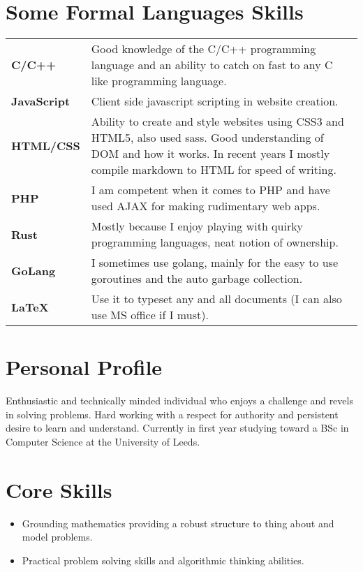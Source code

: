 \documentclass[9pt,a4paper]{article}
\begin{document}
\begin{multicols*}{2}
  \section*{Some Formal Languages Skills}
\begin{center}
  \begin{tabular}{p{2cm} p{6cm}}
  \textbf{C/C++}&Good knowledge of the C/C++ programming language and an ability to catch on fast to any C like programming language.\\[.1cm]
  \textbf{JavaScript}&Client side javascript scripting in website creation.\\[.1cm]
  \textbf{HTML/CSS}&Ability to create and style websites using CSS3 and HTML5, also used sass. Good understanding of DOM and how it works. In recent years I mostly compile markdown to HTML for speed of writing.\\[.1cm]
  \textbf{PHP}&I am competent when it comes to PHP and have used AJAX for making rudimentary web apps.\\[.1cm]
  \textbf{Rust}&Mostly because I enjoy playing with quirky programming languages, neat notion of ownership.\\[.1cm]
  \textbf{GoLang}&I sometimes use golang, mainly for the easy to use goroutines and the auto garbage collection.\\[.1cm]
  \textbf{\LaTeX}&Use it to typeset any and all documents (I can also use MS office if I must).\\
\end{tabular}
\end{center}

\section*{Personal Profile}
Enthusiastic and technically minded individual who enjoys a challenge and revels in solving problems.
Hard working with a respect for authority and persistent desire to learn and understand.
Currently in first year studying toward a BSc in Computer Science at the University of Leeds.

\section*{Core Skills}
\begin{itemize}
\item Grounding mathematics providing a robust structure to thing about and model problems.

\item Practical problem solving skills and algorithmic thinking abilities.


\end{itemize}
\end{multicols*}
\end{document}
